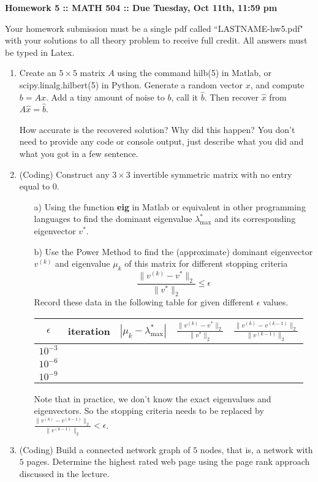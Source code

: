 \documentclass[12pt]{article}
\begin{document}
\vspace{.2 cm}

\begin{center}
{ \bf Homework 5 :: MATH 504 ::  Due Tuesday, Oct 11th, 11:59 pm} \\[.2in]
\end{center}
Your homework submission must be a single pdf called ``LASTNAME-hw5.pdf" 
with your solutions to all theory problem to receive full credit. All answers must be typed in Latex. 

\begin{enumerate}
 \item Create an $5\times 5$ matrix $A$ using the command {hilb(5)} in Matlab,
or {scipy.linalg.hilbert(5)} in Python. Generate a random vector $x$, and compute $b=Ax$.
Add a tiny amount of noise to $b$, call it $\hat b$. Then recover $\hat x$ from $A\hat x=\hat b$. 

How accurate is the recovered solution? Why did this happen?
You don't need to provide any code or console output, just describe what you did and what you got in a few sentence. 

\item (Coding) Construct any $3 \times 3$ invertible symmetric matrix with no entry equal to $0$.  

\begin{itemize}
\item [a)] Using the function \textbf{eig} in Matlab or equivalent in other programming languages to find the dominant eigenvalue $\lambda^*_{\max}$ and its corresponding eigenvector $v^*$.
\item [b)] Use the Power Method to find the (approximate) dominant eigenvector $v^{(k)}$ and eigenvalue 
$\mu_k$ of this matrix for different stopping criteria 
\[
\frac{\| v^{(k)}-v^*\|_2}{\|v^*\|_2}\le \epsilon
\]
Record these data in the following table for given different $\epsilon$ values.

\begin{center}
\begin{tabular}{|c|c|c|c|c|}
 \hline
$\epsilon$   & iteration &    $|\mu_k-\lambda_{\max}^*|$ &  $\frac{\|v^{(k)}-v^*\|_2}{\|v^*\|_2}$  & $\frac{\|v^{(k)}-v^{(k-1)}\|_2}{\|v^{(k-1)}\|_2}$         \\ \hline
$10^{-3}$& && & \\ \hline
$10^{-6}$ & && & \\  \hline
$10^{-9}$& && & \\  \hline
\end{tabular}
\end{center}

\noindent
Note that in practice, we don't know the exact eigenvalues and eigenvectors. So the stopping criteria needs to be 
replaced by  $\frac{\|v^{(k)}-v^{(k-1)}\|_2}{\|v^{(k-1)}\|_2}<\epsilon$.  
\end{itemize}


\item (Coding) Build a connected network graph of $5$ nodes, that is, a network with $5$ pages.
Determine the highest rated web page using the page rank approach discussed in the lecture.



\end{enumerate}
\end{document}
